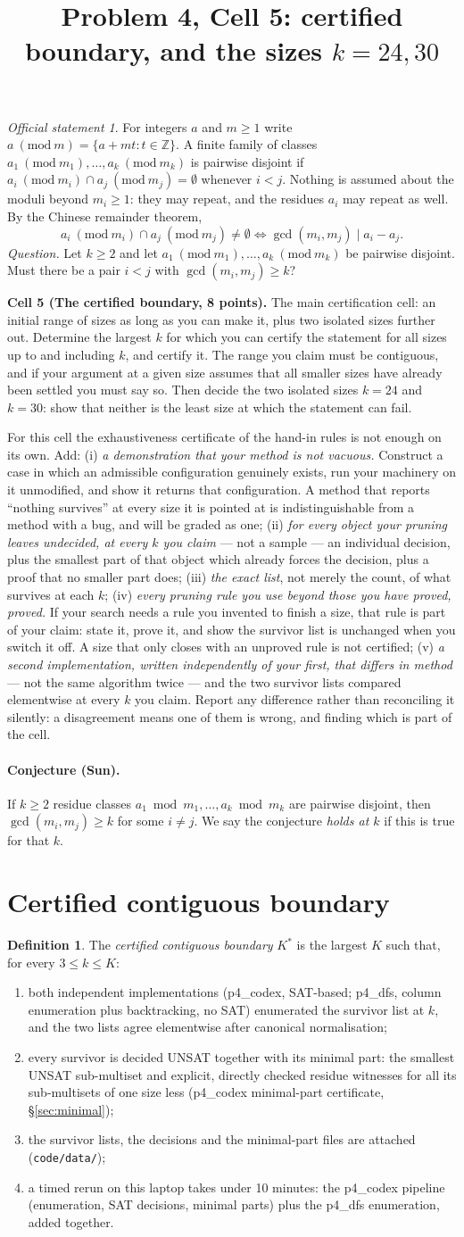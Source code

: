 \documentclass[11pt]{article}
\title{Problem 4, Cell 5: certified boundary, and the sizes $k=24,30$}
\author{}
\date{}
\theoremstyle{definition}
\newtheorem{definition}[theorem]{Definition}
\theoremstyle{remark}
\newtheorem*{statement}{Official statement}
\newcommand{\CELLTASK}{\textbf{Cell 5 (The certified boundary, 8 points).} The main certification cell: an initial range of sizes as long as you can make it, plus two isolated sizes further out. Determine the largest $k$ for which you can certify the statement for all sizes up to and including $k$, and certify it. The range you claim must be contiguous, and if your argument at a given size assumes that all smaller sizes have already been settled you must say so. Then decide the two isolated sizes $k=24$ and $k=30$: show that neither is the least size at which the statement can fail.\par\smallskip For this cell the exhaustiveness certificate of the hand-in rules is not enough on its own. Add: (i) \emph{a demonstration that your method is not vacuous.} Construct a case in which an admissible configuration genuinely exists, run your machinery on it unmodified, and show it returns that configuration. A method that reports ``nothing survives'' at every size it is pointed at is indistinguishable from a method with a bug, and will be graded as one; (ii) \emph{for every object your pruning leaves undecided, at every $k$ you claim} --- not a sample --- an individual decision, plus the smallest part of that object which already forces the decision, plus a proof that no smaller part does; (iii) \emph{the exact list}, not merely the count, of what survives at each $k$; (iv) \emph{every pruning rule you use beyond those you have proved, proved.} If your search needs a rule you invented to finish a size, that rule is part of your claim: state it, prove it, and show the survivor list is unchanged when you switch it off. A size that only closes with an unproved rule is not certified; (v) \emph{a second implementation, written independently of your first, that differs in method} --- not the same algorithm twice --- and the two survivor lists compared elementwise at every $k$ you claim. Report any difference rather than reconciling it silently: a disagreement means one of them is wrong, and finding which is part of the cell.}
\begin{document}
\maketitle

\begin{statement}
For integers $a$ and $m\ge1$ write $a\ (\mathrm{mod}\ m)=\{a+mt:t\in\mathbb{Z}\}$. A finite family
of classes $a_1\ (\mathrm{mod}\ m_1),\dots,a_k\ (\mathrm{mod}\ m_k)$ is pairwise disjoint if
$a_i\ (\mathrm{mod}\ m_i)\cap a_j\ (\mathrm{mod}\ m_j)=\emptyset$ whenever $i<j$. Nothing is assumed
about the moduli beyond $m_i\ge1$: they may repeat, and the residues $a_i$ may repeat as well. By the
Chinese remainder theorem,
\[
  a_i\ (\mathrm{mod}\ m_i)\cap a_j\ (\mathrm{mod}\ m_j)\neq\emptyset\iff\gcd(m_i,m_j)\mid a_i-a_j.\tag{$*$}
\]
\emph{Question.} Let $k\ge2$ and let $a_1\ (\mathrm{mod}\ m_1),\dots,a_k\ (\mathrm{mod}\ m_k)$ be
pairwise disjoint. Must there be a pair $i<j$ with $\gcd(m_i,m_j)\ge k$?

\CELLTASK
\end{statement}

\paragraph{Conjecture (Sun).} If $k\ge2$ residue classes $a_1\bmod m_1,\dots,a_k\bmod m_k$ are
pairwise disjoint, then $\gcd(m_i,m_j)\ge k$ for some $i\ne j$. We say the conjecture
\emph{holds at $k$} if this is true for that $k$.

\section{Certified contiguous boundary}

\begin{definition}
The \emph{certified contiguous boundary} $K^\ast$ is the largest $K$ such that, for every
$3\le k\le K$:
\begin{enumerate}
\item both independent implementations (p4\_codex, SAT-based; p4\_dfs, column enumeration
  plus backtracking, no SAT) enumerated the survivor list at $k$, and the two lists agree
  elementwise after canonical normalisation;
\item every survivor is decided UNSAT together with its minimal part: the smallest UNSAT
  sub-multiset and explicit, directly checked residue witnesses for all its sub-multisets of one
  size less (p4\_codex minimal-part certificate, \S\ref{sec:minimal});
\item the survivor lists, the decisions and the minimal-part files are attached
  (\texttt{code/data/});
\item a timed rerun on this laptop takes under 10 minutes: the p4\_codex pipeline (enumeration,
  SAT decisions, minimal parts) plus the p4\_dfs enumeration, added together.
\end{enumerate}
\end{definition}
\end{document}
